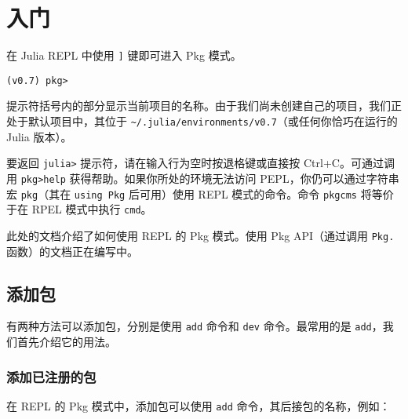 \hypertarget{4066476927559720001}{}


\section{入门}



在 Julia REPL 中使用 \texttt{]} 键即可进入 Pkg 模式。




\begin{lstlisting}
(v0.7) pkg>
\end{lstlisting}



提示符括号内的部分显示当前项目的名称。由于我们尚未创建自己的项目，我们正处于默认项目中，其位于 \texttt{{\textasciitilde}/.julia/environments/v0.7}（或任何你恰巧在运行的 Julia 版本）。



要返回 \texttt{julia>} 提示符，请在输入行为空时按退格键或直接按 Ctrl+C。可通过调用 \texttt{pkg>help} 获得帮助。如果你所处的环境无法访问 PEPL，你仍可以通过字符串宏 \texttt{pkg}（其在 \texttt{using Pkg} 后可用）使用 REPL 模式的命令。命令 \texttt{pkg{\textquotedbl}cms{\textquotedbl}} 将等价于在 RPEL 模式中执行 \texttt{cmd}。



此处的文档介绍了如何使用 REPL 的 Pkg 模式。使用 Pkg API（通过调用 \texttt{Pkg.} 函数）的文档正在编写中。



\hypertarget{17544737972677030323}{}


\subsection{添加包}



有两种方法可以添加包，分别是使用 \texttt{add} 命令和 \texttt{dev} 命令。最常用的是 \texttt{add}，我们首先介绍它的用法。



\hypertarget{8492524675297016695}{}


\subsubsection{添加已注册的包}



在 REPL 的 Pkg 模式中，添加包可以使用 \texttt{add} 命令，其后接包的名称，例如：




